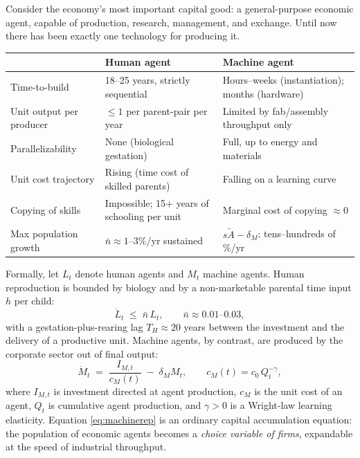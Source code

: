 \documentclass[11pt]{article}
\begin{document}
Consider the economy's most important capital good: a general-purpose economic agent, capable of production, research, management, and exchange. Until now there has been exactly one technology for producing it.

\begin{center}
\begin{tabular}{@{}p{4.1cm}p{4.6cm}p{4.9cm}@{}}
\toprule
 & \textbf{Human agent} & \textbf{Machine agent} \\
\midrule
Time-to-build & 18--25 years, strictly sequential & Hours--weeks (instantiation); months (hardware) \\
Unit output per producer & $\le 1$ per parent-pair per year & Limited by fab/assembly throughput only \\
Parallelizability & None (biological gestation) & Full, up to energy and materials \\
Unit cost trajectory & Rising (time cost of skilled parents) & Falling on a learning curve \citep{wright1936} \\
Copying of skills & Impossible; 15+ years of schooling per unit & Marginal cost of copying $\approx 0$ \\
Max population growth & $\bar n \approx 1\text{--}3\%$/yr sustained & $s\tilde A - \delta_M$: tens--hundreds of \%/yr \\
\bottomrule
\end{tabular}
\end{center}

\noindent Formally, let $L_t$ denote human agents and $M_t$ machine agents. Human reproduction is bounded by biology and by a non-marketable parental time input $h$ per child:
\begin{equation}
\dot L_t \;\le\; \bar n\, L_t, \qquad \bar n \approx 0.01\text{--}0.03,
\label{eq:humanrep}
\end{equation}
with a gestation-plus-rearing lag $T_H \approx 20$ years between the investment and the delivery of a productive unit. Machine agents, by contrast, are produced by the corporate sector out of final output:
\begin{equation}
\dot M_t \;=\; \frac{I_{M,t}}{c_M(t)} \;-\; \delta_M M_t,
\qquad c_M(t) = c_0\, Q_t^{-\gamma},
\label{eq:machinerep}
\end{equation}
where $I_{M,t}$ is investment directed at agent production, $c_M$ is the unit cost of an agent, $Q_t$ is cumulative agent production, and $\gamma>0$ is a Wright-law learning elasticity. Equation \eqref{eq:machinerep} is an ordinary capital accumulation equation: the population of economic agents becomes a \emph{choice variable of firms}, expandable at the speed of industrial throughput.
\end{document}
